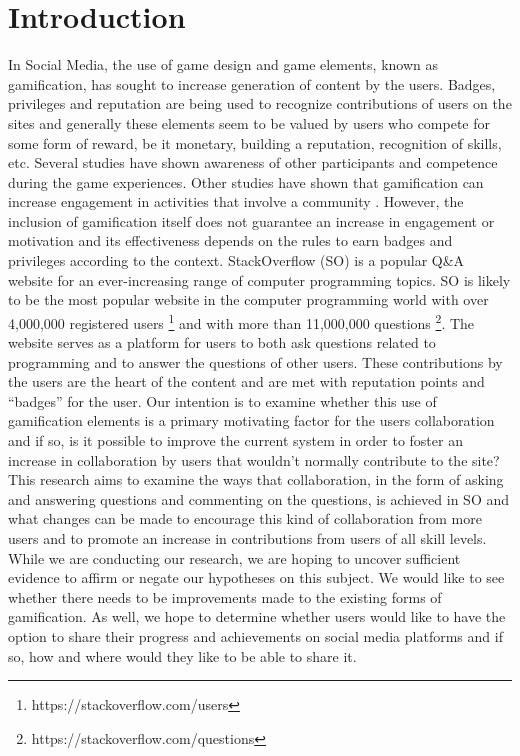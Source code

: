 \documentclass{sigchi}
\begin{document}

 

\section{Introduction}
In Social Media, the use of game design and game elements, known as gamification, has sought to increase generation of content by the users. Badges, privileges and reputation are being used to recognize contributions of users on the sites and generally these elements seem to be valued by users who compete for some form of reward, be it monetary, building a reputation, recognition of skills, etc. Several studies have shown awareness of other participants and competence during the game experiences\cite{Rughinis}. Other studies have shown that gamification can increase engagement in activities that involve a community \cite{Marder}. However, the inclusion of gamification itself does not guarantee an increase in engagement or motivation and its effectiveness depends on the rules to earn badges and privileges  according to the context\cite{Deterding}.
StackOverflow (SO) is a popular Q\&A website for an ever-increasing range of computer programming topics. SO is likely to be the most popular website in the computer programming world with over 4,000,000 registered users \footnote{https://stackoverflow.com/users} and with more than 11,000,000 questions \footnote{https://stackoverflow.com/questions}. The website serves as a platform for users to both ask questions related to programming and to answer the questions of other users. These contributions by the users are the heart of the content and are met with reputation points and “badges” for the user. Our intention is to examine whether this use of gamification elements is a primary motivating factor for the users collaboration and if so, is it possible to improve the current system in order to foster an increase in collaboration by users that wouldn't normally contribute to the site? 
This research aims to examine the ways that collaboration, in the form of asking and answering questions and commenting on the questions, is achieved in SO and what changes can be made to encourage this kind of collaboration from more users and to promote an increase in contributions from users of all skill levels. 
While we are conducting our research, we are hoping to uncover sufficient evidence to affirm or negate our hypotheses on this subject. We would like to see whether there needs to be improvements made to the existing forms of gamification. As well, we hope to determine whether users would like to have the option to share their progress and achievements on social media platforms and if so, how and where would they like to be able to share it.
\end{document}
